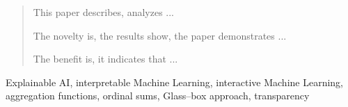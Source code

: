 \documentclass[a4paper,5p,review]{elsarticle}
\begin{document}
\begin{frontmatter}
\begin{abstract}
This paper describes, analyzes  ...

The novelty is, the results show, the paper demonstrates ...

The benefit is, it indicates that ...



\end{abstract}

\begin{keyword}
Explainable AI, interpretable Machine Learning, interactive Machine Learning, aggregation functions, ordinal sums, Glass--box approach, transparency 
\end{keyword}

\end{frontmatter}
\linenumbers



\end{document}
